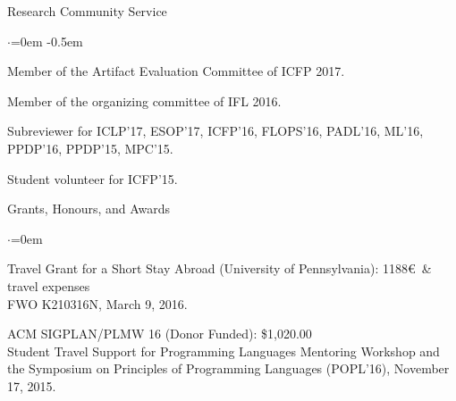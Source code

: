 \documentclass{resume} %
\begin{document}
\begin{rSection}{Research Community Service}

\smallskip\smallskip
\begin{list}{$\cdot$}{\leftmargin=0em} %
 \itemsep -0.5em \vspace{-0.5em}       %

\item Member of the Artifact Evaluation Committee of ICFP 2017.

\item Member of the organizing committee of IFL 2016.

\item Subreviewer for ICLP'17, ESOP'17, ICFP'16, FLOPS'16, PADL'16, ML'16, PPDP'16, PPDP'15, MPC'15.

\item Student volunteer for ICFP'15.

\end{list}

\end{rSection}



\begin{rSection}{Grants, Honours, and Awards} %

\smallskip\smallskip
\begin{list}{$\cdot$}{\leftmargin=0em} %

\item Travel Grant for a Short Stay Abroad (University of Pennsylvania): 1188\euro ~\& travel expenses\\
      FWO K210316N, March 9, 2016.

\item ACM SIGPLAN/PLMW 16 (Donor Funded): \$1,020.00\\
      Student Travel Support for Programming Languages Mentoring Workshop
      and the Symposium on Principles of Programming Languages (POPL'16), November 17, 2015.
\end{list}

\end{rSection}
\end{document}
